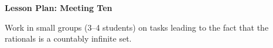 \documentclass[12pt]{amsart}
\theoremstyle{definition}
\begin{document}
\begin{center}
\textbf{\Huge
Lesson Plan: Meeting Ten
}
\end{center}
\vspace{.5in}

Work in small groups (3--4 students) on tasks leading to the fact that the rationals is a countably infinite set.
\end{document}
